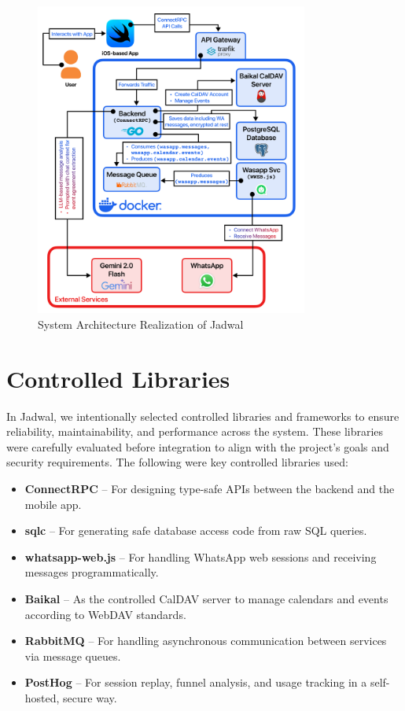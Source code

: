 \begin{figure}[!h]
    \centering
    \includegraphics[width=0.8\textwidth]{images/system-architecture-realization.png}
    \caption{System Architecture Realization of Jadwal}
    \label{fig:architecture-realization}
\end{figure}

\section{Controlled Libraries}

In Jadwal, we intentionally selected controlled libraries and frameworks to ensure reliability, maintainability, and performance across the system. These libraries were carefully evaluated before integration to align with the project’s goals and security requirements. The following were key controlled libraries used:

\begin{itemize}
    \item \textbf{ConnectRPC} – For designing type-safe APIs between the backend and the mobile app.
    \item \textbf{sqlc} – For generating safe database access code from raw SQL queries.
    \item \textbf{whatsapp-web.js} – For handling WhatsApp web sessions and receiving messages programmatically.
    \item \textbf{Baikal} – As the controlled CalDAV server to manage calendars and events according to WebDAV standards.
    \item \textbf{RabbitMQ} – For handling asynchronous communication between services via message queues.
    \item \textbf{PostHog} – For session replay, funnel analysis, and usage tracking in a self-hosted, secure way.
\end{itemize}

